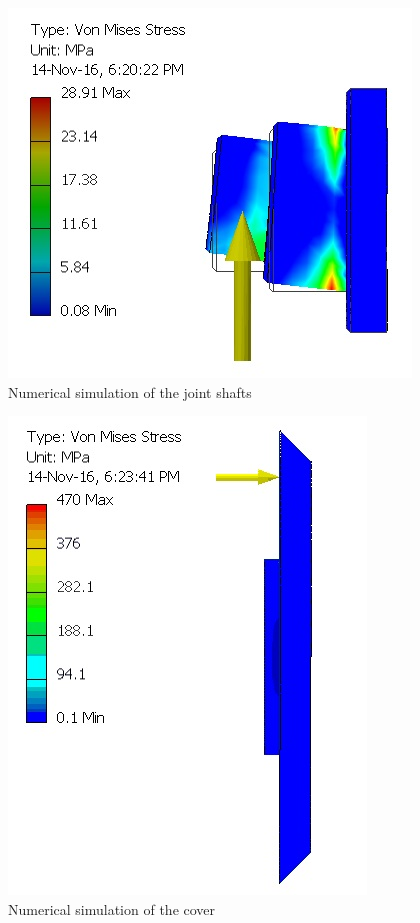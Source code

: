    \begin{figure}[thpb]
      \centering
      \includegraphics[scale=0.8]{Images/Simulacao_eixo.jpg}
      \caption{Numerical simulation of the joint shafts}
      \label{simulacao eixo}
   \end{figure}
   
   \begin{figure}[thpb]
      \centering
      \includegraphics[scale=0.6]{Images/Simulacao_tampa.jpg}
      \caption{Numerical simulation of the cover}
      \label{simulacao tampa}
   \end{figure}
   
